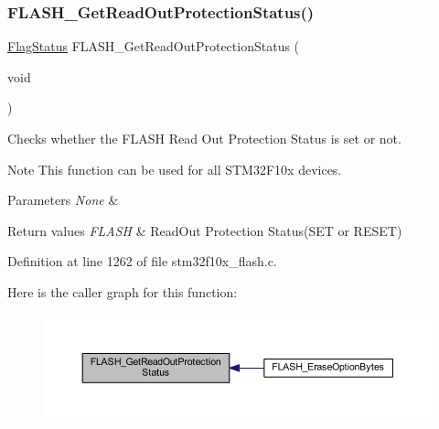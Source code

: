 \subsubsection{\texorpdfstring{F\+L\+A\+S\+H\+\_\+\+Get\+Read\+Out\+Protection\+Status()}{FLASH\_GetReadOutProtectionStatus()}}
{\footnotesize\ttfamily \hyperlink{group___exported__types_ga89136caac2e14c55151f527ac02daaff}{Flag\+Status} F\+L\+A\+S\+H\+\_\+\+Get\+Read\+Out\+Protection\+Status (\begin{DoxyParamCaption}\item[{void}]{ }\end{DoxyParamCaption})}



Checks whether the F\+L\+A\+SH Read Out Protection Status is set or not. 

\begin{DoxyNote}{Note}
This function can be used for all S\+T\+M32\+F10x devices. 
\end{DoxyNote}

\begin{DoxyParams}{Parameters}
{\em None} & \\
\hline
\end{DoxyParams}

\begin{DoxyRetVals}{Return values}
{\em F\+L\+A\+SH} & Read\+Out Protection Status(\+S\+E\+T or R\+E\+S\+E\+T) \\
\hline
\end{DoxyRetVals}


Definition at line 1262 of file stm32f10x\+\_\+flash.\+c.

Here is the caller graph for this function\+:
\nopagebreak
\begin{figure}[H]
\begin{center}
\leavevmode
\includegraphics[width=350pt]{group___f_l_a_s_h___private___functions_ga57fe56770ff25b358f3e36bd70632e37_icgraph}
\end{center}
\end{figure}
\mbox{\label{group___f_l_a_s_h___private___functions_gac265b8d1e7ea11e44ceee28797c3debb}} 
